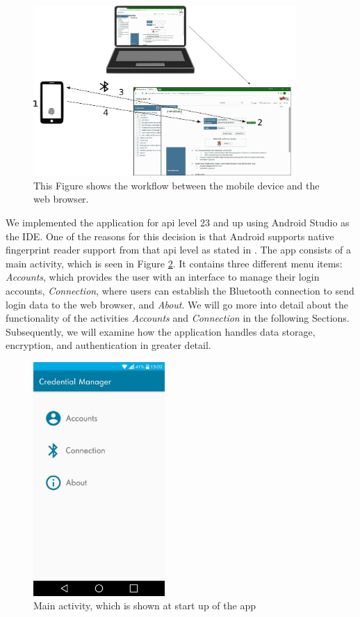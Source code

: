\vspace{0.5cm}
\begin{figure}[!htb]
	\centering
	\includegraphics[width=10cm]{images/Communication.png}
	\caption[Communication between devices]{This Figure shows the workflow between the mobile device and the web browser.}
	\label{fig:comm}
\end{figure}
\vspace{0.5cm}



\noindent We implemented the application for \gls{api} level 23 and up using Android Studio as the IDE. One of the reasons for this decision is that Android supports native fingerprint reader support from that \gls{api} level as stated in \cite{AndroidM}. The app consists of a main activity, which is seen in Figure \ref{fig:mainactivity}. It contains three different menu items: \textit{Accounts}, which provides the user with an interface to manage their login accounts, \textit{Connection}, where users can establish the Bluetooth connection to send login data to the web browser, and \textit{About}. We will go more into detail about the functionality of the activities \textit{Accounts} and \textit{Connection} in the following Sections. Subsequently, we will examine how the application handles data storage, encryption, and authentication in greater detail.

\begin{figure}[!htb]
\centering
\includegraphics[width=5cm]{images/MainActivityNew}
\caption[Main Activity]{Main activity, which is shown at start up of the app}
\label{fig:mainactivity}
\end{figure}

